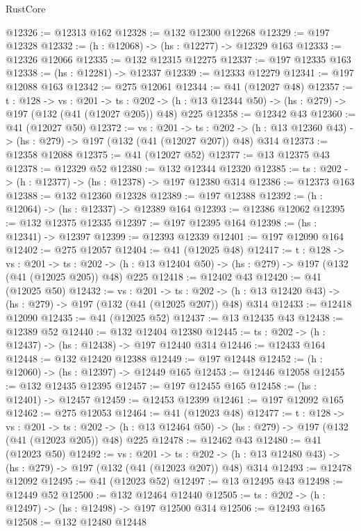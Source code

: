\begin{lexlean}{RustCore}
\begin{coremodule}
@12326 := @12313 @162
@12328 := @132 @12300 @12268
@12329 := @197 @12328
@12332 := (h : @12068) -> (hs : @12277) -> @12329 @163
@12333 := @12326 @12066
@12335 := @132 @12315 @12275
@12337 := @197 @12335 @163
@12338 := (hs : @12281) -> @12337
@12339 := @12333 @12279
@12341 := @197 @12088 @163
@12342 := @275 @12061
@12344 := @41 (@12027 @48)
@12357 := {t : @128} ->
  {vs : @201} ->
  {ts : @202} -> (h : @13 @12344 @50) -> (hs : @279) -> @197 (@132 (@41 (@12027 @205)) @48) @225
@12358 := @12342 @43
@12360 := @41 (@12027 @50)
@12372 := {vs : @201} ->
  {ts : @202} -> (h : @13 @12360 @43) -> (hs : @279) -> @197 (@132 (@41 (@12027 @207)) @48) @314
@12373 := @12358 @12088
@12375 := @41 (@12027 @52)
@12377 := @13 @12375 @43
@12378 := @12329 @52
@12380 := @132 @12344 @12320
@12385 := {ts : @202} -> (h : @12377) -> (hs : @12378) -> @197 @12380 @314
@12386 := @12373 @163
@12388 := @132 @12360 @12328
@12389 := @197 @12388
@12392 := (h : @12064) -> (hs : @12337) -> @12389 @164
@12393 := @12386 @12062
@12395 := @132 @12375 @12335
@12397 := @197 @12395 @164
@12398 := (hs : @12341) -> @12397
@12399 := @12393 @12339
@12401 := @197 @12090 @164
@12402 := @275 @12057
@12404 := @41 (@12025 @48)
@12417 := {t : @128} ->
  {vs : @201} ->
  {ts : @202} -> (h : @13 @12404 @50) -> (hs : @279) -> @197 (@132 (@41 (@12025 @205)) @48) @225
@12418 := @12402 @43
@12420 := @41 (@12025 @50)
@12432 := {vs : @201} ->
  {ts : @202} -> (h : @13 @12420 @43) -> (hs : @279) -> @197 (@132 (@41 (@12025 @207)) @48) @314
@12433 := @12418 @12090
@12435 := @41 (@12025 @52)
@12437 := @13 @12435 @43
@12438 := @12389 @52
@12440 := @132 @12404 @12380
@12445 := {ts : @202} -> (h : @12437) -> (hs : @12438) -> @197 @12440 @314
@12446 := @12433 @164
@12448 := @132 @12420 @12388
@12449 := @197 @12448
@12452 := (h : @12060) -> (hs : @12397) -> @12449 @165
@12453 := @12446 @12058
@12455 := @132 @12435 @12395
@12457 := @197 @12455 @165
@12458 := (hs : @12401) -> @12457
@12459 := @12453 @12399
@12461 := @197 @12092 @165
@12462 := @275 @12053
@12464 := @41 (@12023 @48)
@12477 := {t : @128} ->
  {vs : @201} ->
  {ts : @202} -> (h : @13 @12464 @50) -> (hs : @279) -> @197 (@132 (@41 (@12023 @205)) @48) @225
@12478 := @12462 @43
@12480 := @41 (@12023 @50)
@12492 := {vs : @201} ->
  {ts : @202} -> (h : @13 @12480 @43) -> (hs : @279) -> @197 (@132 (@41 (@12023 @207)) @48) @314
@12493 := @12478 @12092
@12495 := @41 (@12023 @52)
@12497 := @13 @12495 @43
@12498 := @12449 @52
@12500 := @132 @12464 @12440
@12505 := {ts : @202} -> (h : @12497) -> (hs : @12498) -> @197 @12500 @314
@12506 := @12493 @165
@12508 := @132 @12480 @12448

\end{coremodule}
\end{lexlean}
